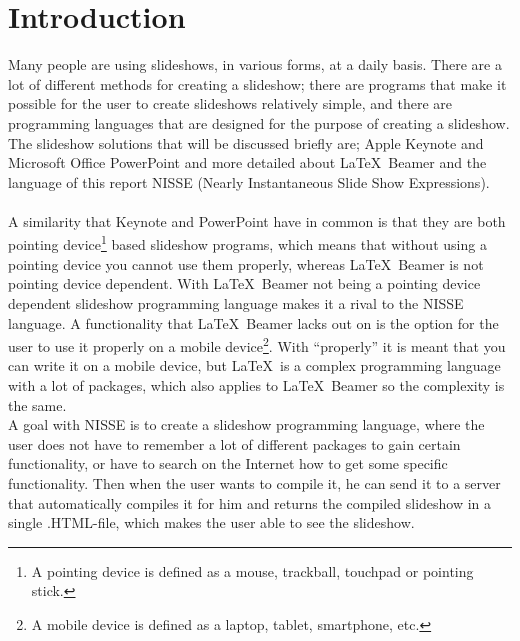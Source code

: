 \chapter{Introduction}
Many people are using slideshows, in various forms, at a daily basis. There are a lot of different methods for creating a slideshow; there are programs that make it possible for the user to create slideshows relatively simple, and there are programming languages that are designed for the purpose of creating a slideshow. The slideshow solutions that will be discussed briefly are; Apple Keynote and Microsoft Office PowerPoint and more detailed about \LaTeX~Beamer and the language of this report NISSE (Nearly Instantaneous Slide Show Expressions).
\\ \\
A similarity that Keynote and PowerPoint have in common is that they are both pointing device\footnote{A pointing device is defined as a mouse, trackball, touchpad or pointing stick.} based slideshow programs, which means that without using a pointing device you cannot use them properly, whereas \LaTeX~Beamer is not pointing device dependent. With \LaTeX~Beamer not being a pointing device dependent slideshow programming language makes it a rival to the NISSE language.
A functionality that \LaTeX~Beamer lacks out on is the option for the user to use it properly on a mobile device\footnote{A mobile device is defined as a laptop, tablet, smartphone, etc.}. With ``properly'' it is meant that you can write it on a mobile device, but \LaTeX~is a complex programming language with a lot of packages, which also applies to \LaTeX~Beamer so the complexity is the same. \\
A goal with NISSE is to create a slideshow programming language, where the user does not have to remember a lot of different packages to gain certain functionality, or have to search on the Internet how to get some specific functionality. Then when the user wants to compile it, he can send it to a server that automatically compiles it for him and returns the compiled slideshow in a single .HTML-file, which makes the user able to see the slideshow.\\



